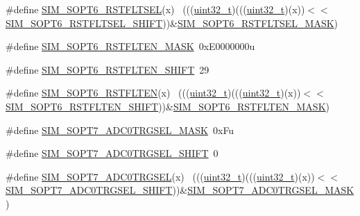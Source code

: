 \begin{DoxyCompactItemize}
\item 
\#define \hyperlink{group___s_i_m___register___masks_ga291ab943661d8905f927c22f629ba5ef}{S\+I\+M\+\_\+\+S\+O\+P\+T6\+\_\+\+R\+S\+T\+F\+L\+T\+S\+EL}(x)                                  ~(((\hyperlink{_p_e___types_8h_a33594304e786b158f3fb30289278f5af}{uint32\+\_\+t})(((\hyperlink{_p_e___types_8h_a33594304e786b158f3fb30289278f5af}{uint32\+\_\+t})(x))$<$$<$\hyperlink{group___s_i_m___register___masks_gadc37bd1fea7eccbbef05b7cbaf85910b}{S\+I\+M\+\_\+\+S\+O\+P\+T6\+\_\+\+R\+S\+T\+F\+L\+T\+S\+E\+L\+\_\+\+S\+H\+I\+FT}))\&\hyperlink{group___s_i_m___register___masks_ga3af8833f5e7ea733eb6b46a8bf1aaec0}{S\+I\+M\+\_\+\+S\+O\+P\+T6\+\_\+\+R\+S\+T\+F\+L\+T\+S\+E\+L\+\_\+\+M\+A\+SK})
\item 
\#define \hyperlink{group___s_i_m___register___masks_ga682a8fa2abc6dadb5119dd5c323ce129}{S\+I\+M\+\_\+\+S\+O\+P\+T6\+\_\+\+R\+S\+T\+F\+L\+T\+E\+N\+\_\+\+M\+A\+SK}~0x\+E0000000u
\item 
\#define \hyperlink{group___s_i_m___register___masks_ga9961365e7e4494ba14721b89e8d98916}{S\+I\+M\+\_\+\+S\+O\+P\+T6\+\_\+\+R\+S\+T\+F\+L\+T\+E\+N\+\_\+\+S\+H\+I\+FT}~29
\item 
\#define \hyperlink{group___s_i_m___register___masks_ga7f0f39e18529864eed9f9b91da27bde9}{S\+I\+M\+\_\+\+S\+O\+P\+T6\+\_\+\+R\+S\+T\+F\+L\+T\+EN}(x)                                    ~(((\hyperlink{_p_e___types_8h_a33594304e786b158f3fb30289278f5af}{uint32\+\_\+t})(((\hyperlink{_p_e___types_8h_a33594304e786b158f3fb30289278f5af}{uint32\+\_\+t})(x))$<$$<$\hyperlink{group___s_i_m___register___masks_ga9961365e7e4494ba14721b89e8d98916}{S\+I\+M\+\_\+\+S\+O\+P\+T6\+\_\+\+R\+S\+T\+F\+L\+T\+E\+N\+\_\+\+S\+H\+I\+FT}))\&\hyperlink{group___s_i_m___register___masks_ga682a8fa2abc6dadb5119dd5c323ce129}{S\+I\+M\+\_\+\+S\+O\+P\+T6\+\_\+\+R\+S\+T\+F\+L\+T\+E\+N\+\_\+\+M\+A\+SK})
\item 
\#define \hyperlink{group___s_i_m___register___masks_gaeda70babef834cacace2c775d62bb4ae}{S\+I\+M\+\_\+\+S\+O\+P\+T7\+\_\+\+A\+D\+C0\+T\+R\+G\+S\+E\+L\+\_\+\+M\+A\+SK}~0x\+Fu
\item 
\#define \hyperlink{group___s_i_m___register___masks_ga914ced2a5cf4e7f37371d52d34d4a930}{S\+I\+M\+\_\+\+S\+O\+P\+T7\+\_\+\+A\+D\+C0\+T\+R\+G\+S\+E\+L\+\_\+\+S\+H\+I\+FT}~0
\item 
\#define \hyperlink{group___s_i_m___register___masks_ga3688192d4b3dce98ac9b670242a38b23}{S\+I\+M\+\_\+\+S\+O\+P\+T7\+\_\+\+A\+D\+C0\+T\+R\+G\+S\+EL}(x)                                ~(((\hyperlink{_p_e___types_8h_a33594304e786b158f3fb30289278f5af}{uint32\+\_\+t})(((\hyperlink{_p_e___types_8h_a33594304e786b158f3fb30289278f5af}{uint32\+\_\+t})(x))$<$$<$\hyperlink{group___s_i_m___register___masks_ga914ced2a5cf4e7f37371d52d34d4a930}{S\+I\+M\+\_\+\+S\+O\+P\+T7\+\_\+\+A\+D\+C0\+T\+R\+G\+S\+E\+L\+\_\+\+S\+H\+I\+FT}))\&\hyperlink{group___s_i_m___register___masks_gaeda70babef834cacace2c775d62bb4ae}{S\+I\+M\+\_\+\+S\+O\+P\+T7\+\_\+\+A\+D\+C0\+T\+R\+G\+S\+E\+L\+\_\+\+M\+A\+SK})
$$
\end{DoxyCompactItemize}

